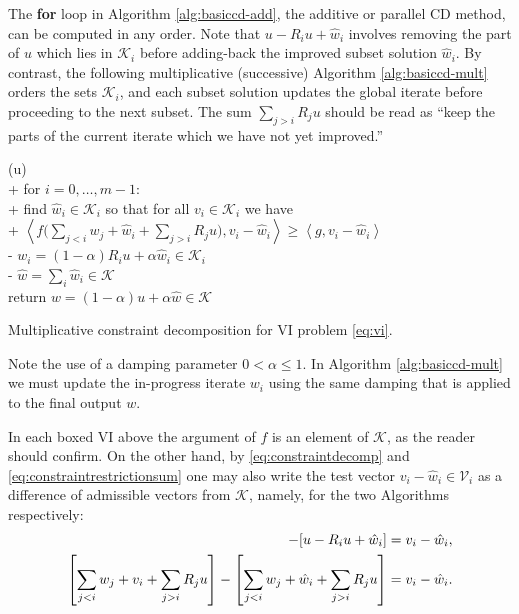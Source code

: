 \documentclass[letterpaper,final,12pt,reqno]{amsart}
\theoremstyle{cstyle}
\theoremstyle{cstyle*}
\theoremstyle{dstyle}
\numberwithin{equation}{section}
\numberwithin{figure}{section}
\numberwithin{table}{section}
\numberwithin{theorem}{section}
\newcommand{\cK}{\mathcal{K}}
\newcommand{\cV}{\mathcal{V}}
\newcommand{\ip}[2]{\left<#1,#2\right>}
\begin{document}
The \textbf{for} loop in Algorithm \ref{alg:basiccd-add}, the additive or parallel CD method, can be computed in any order.  Note that $u-R_iu+\hat w_i$ involves removing the part of $u$ which lies in $\mathcal{K}_i$ before adding-back the improved subset solution $\hat w_i$.  By contrast, the following multiplicative (successive) Algorithm \ref{alg:basiccd-mult} orders the sets $\mathcal{K}_i$, and each subset solution updates the global iterate before proceeding to the next subset.  The sum $\sum_{j>i} R_j u$ should be read as ``keep the parts of the current iterate which we have not yet improved.''

\begin{pseudofloat}[H]
\begin{pseudo*}
(u\in\cK)\text{:} \\+
    for $i = 0,\dots,m-1$: \\+
        \rm{find} $\hat w_i\in \cK_i$ \rm{so that for all} $v_i\in \cK_i$ \rm{we have} \\+
            $\displaystyle \boxed{\ip{f\Big(\sum_{j<i} w_j + \hat w_i + \sum_{j>i} R_j u\Big)}{v_i-\hat w_i} \ge \ip{g}{v_i-\hat w_i}}$ \\-
            $w_i = (1-\alpha) R_i u + \alpha \hat w_i\in\cK_i$ \\-
    $\hat w = \sum_i \hat w_i\in\cK$ \\
    return $w=(1-\alpha) u + \alpha \hat w\in\cK$
\end{pseudo*}
\caption{Multiplicative constraint decomposition for VI problem \eqref{eq:vi}.}
\label{alg:basiccd-mult}
\end{pseudofloat}

Note the use of a damping parameter $0<\alpha\le 1$.  In Algorithm \ref{alg:basiccd-mult} we must update the in-progress iterate $w_i$ using the same damping that is applied to the final output $w$.

In each boxed VI above the argument of $f$ is an element of $\cK$, as the reader should confirm.  On the other hand, by \eqref{eq:constraintdecomp} and \eqref{eq:constraintrestrictionsum} one may also write the test vector $v_i - \hat w_i \in \cV_i$ as a difference of admissible vectors from $\cK$, namely, for the two Algorithms respectively:
\begin{align*}
[u - R_i u + v_i] - [u - R_i u + \hat w_i] &= v_i - \hat w_i, \label{eq:admissibledifference} \\
\left[\sum_{j<i} w_j + v_i + \sum_{j>i} R_j u\right] - \left[\sum_{j<i} w_j + \hat w_i + \sum_{j>i} R_j u\right] &= v_i - \hat w_i.  \notag
\end{align*}
\end{document}
